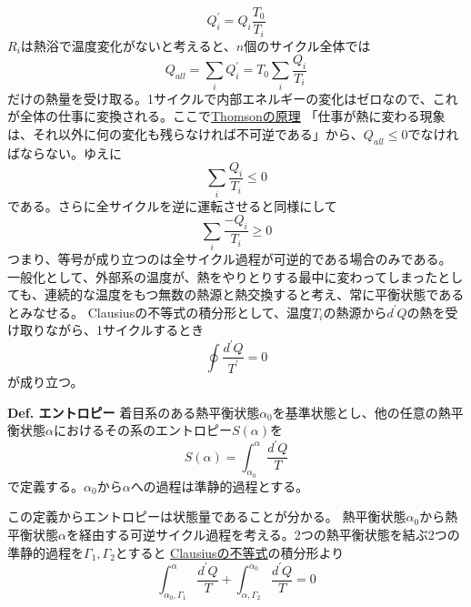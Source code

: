 \documentclass{jsarticle}
\begin{document}
\begin{equation*}
    Q_{i}^{\prime}=Q_{i}\frac{T_{0}}{T_{i}}
\end{equation*}
\(R_{i}\)は熱浴で温度変化がないと考えると、\(n\)個のサイクル全体では
\begin{equation*}
    Q_{all}=\sum_{i}Q_{i}^{\prime}=T_{0}\sum_{i}\frac{Q_{i}}{T_{i}}
\end{equation*}
だけの熱量を受け取る。1サイクルで内部エネルギーの変化はゼロなので、これが全体の仕事に変換される。ここで\hyperlink{Thomsonの原理}{Thomsonの原理}
「仕事が熱に変わる現象は、それ以外に何の変化も残らなければ不可逆である」から、\(Q_{all}\leq0\)でなければならない。ゆえに
\begin{equation*}
    \sum_{i}\frac{Q_{i}}{T_{i}}\leq0
\end{equation*}
である。さらに全サイクルを逆に運転させると同様にして
\begin{equation*}
    \sum_{i}\frac{-Q_{i}}{T_{i}}\geq0
\end{equation*}
つまり、等号が成り立つのは全サイクル過程が可逆的である場合のみである。\\
一般化として、外部系の温度が、熱をやりとりする最中に変わってしまったとしても、連続的な温度をもつ無数の熱源と熱交換すると考え、常に平衡状態であるとみなせる。
Clausiusの不等式の積分形として、温度\(T_{i}\)の熱源から\(d^{\prime}Q\)の熱を受け取りながら、1サイクルするとき
\begin{equation*}
    \oint\frac{d^{\prime}Q}{T^{\prime}}=0
\end{equation*}
が成り立つ。
\hypertarget{エントロピー}{}
\begin{itembox}[l]{\textbf{Def. エントロピー}}
    着目系のある熱平衡状態\(\alpha_{0}\)を基準状態とし、他の任意の熱平衡状態\(\alpha\)におけるその系のエントロピー\(S(\alpha)\)を
    \begin{equation*}
        S(\alpha)=\int_{\alpha_{0}}^{\alpha}\frac{d^{\prime}Q}{T}
    \end{equation*}
    で定義する。\(\alpha_{0}\)から\(\alpha\)への過程は準静的過程とする。
\end{itembox}
この定義からエントロピーは状態量であることが分かる。
熱平衡状態\(\alpha_{0}\)から熱平衡状態\(\alpha\)を経由する可逆サイクル過程を考える。2つの熱平衡状態を結ぶ2つの準静的過程を\(\Gamma_{1},\Gamma_{2}\)とすると
\hyperlink{Clausiusの不等式}{Clausiusの不等式}の積分形より
\begin{equation*}
    \int_{\alpha_{0},\Gamma_{1}}^{\alpha}\frac{d^{\prime}Q}{T}+\int_{\alpha,\Gamma_{2}}^{\alpha_{0}}\frac{d^{\prime}Q}{T}=0
\end{equation*}
\end{document}
